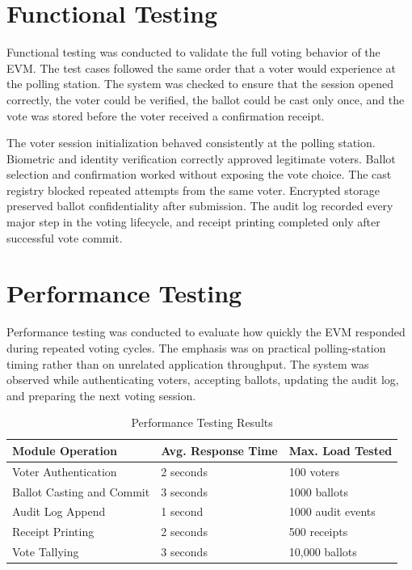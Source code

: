 \section{Functional Testing}
Functional testing was conducted to validate the full voting behavior of the EVM. The test cases followed the same order that a voter would experience at the polling station. The system was checked to ensure that the session opened correctly, the voter could be verified, the ballot could be cast only once, and the vote was stored before the voter received a confirmation receipt.

The voter session initialization behaved consistently at the polling station. Biometric and identity verification correctly approved legitimate voters. Ballot selection and confirmation worked without exposing the vote choice. The cast registry blocked repeated attempts from the same voter. Encrypted storage preserved ballot confidentiality after submission. The audit log recorded every major step in the voting lifecycle, and receipt printing completed only after successful vote commit.

\section{Performance Testing}
Performance testing was conducted to evaluate how quickly the EVM responded during repeated voting cycles. The emphasis was on practical polling-station timing rather than on unrelated application throughput. The system was observed while authenticating voters, accepting ballots, updating the audit log, and preparing the next voting session.

\begin{table}[htbp]
\centering
\caption{Performance Testing Results}
\begin{tabular}{p{}|p{}|p{}}
\toprule
\textbf{Module Operation} & \textbf{Avg. Response Time} & \textbf{Max. Load Tested} \\
\midrule
Voter Authentication & 2 seconds & 100 voters \\
\midrule
Ballot Casting and Commit & 3 seconds & 1000 ballots \\
\midrule
Audit Log Append & 1 second & 1000 audit events \\
\midrule
Receipt Printing & 2 seconds & 500 receipts \\
\midrule
Vote Tallying & 3 seconds & 10,000 ballots \\
\bottomrule
\end{tabular}
\end{table}

